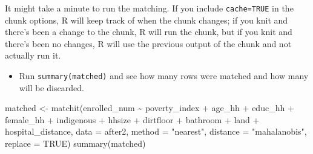 \documentclass[
  letterpaper,
  DIV=11,
  numbers=noendperiod]{scrartcl}
\newenvironment{Shaded}{\begin{snugshade}}{\end{snugshade}}
\newcommand{\AttributeTok}[1]{\textcolor[rgb]{0.40,0.45,0.13}{#1}}
\newcommand{\ConstantTok}[1]{\textcolor[rgb]{0.56,0.35,0.01}{#1}}
\newcommand{\FunctionTok}[1]{\textcolor[rgb]{0.28,0.35,0.67}{#1}}
\newcommand{\NormalTok}[1]{\textcolor[rgb]{0.00,0.23,0.31}{#1}}
\newcommand{\OtherTok}[1]{\textcolor[rgb]{0.00,0.23,0.31}{#1}}
\newcommand{\SpecialCharTok}[1]{\textcolor[rgb]{0.37,0.37,0.37}{#1}}
\newcommand{\StringTok}[1]{\textcolor[rgb]{0.13,0.47,0.30}{#1}}
\providecommand{\tightlist}{%
  \setlength{\itemsep}{0pt}\setlength{\parskip}{0pt}}\usepackage{longtable,booktabs,array}
\begin{document}
It might take a minute to run the matching. If you include
\texttt{cache=TRUE} in the chunk options, R will keep track of when the
chunk changes; if you knit and there's been a change to the chunk, R
will run the chunk, but if you knit and there's been no changes, R will
use the previous output of the chunk and not actually run it.

\begin{itemize}
\tightlist
\item
  Run \texttt{summary(matched)} and see how many rows were matched and
  how many will be discarded.
\end{itemize}

\begin{Shaded}
\begin{Highlighting}[numbers=left,,]
\NormalTok{matched }\OtherTok{\textless{}{-}} \FunctionTok{matchit}\NormalTok{(enrolled\_num }\SpecialCharTok{\textasciitilde{}}\NormalTok{ poverty\_index }\SpecialCharTok{+}\NormalTok{ age\_hh }\SpecialCharTok{+}\NormalTok{ educ\_hh }\SpecialCharTok{+}\NormalTok{ female\_hh }\SpecialCharTok{+} 
\NormalTok{                     indigenous }\SpecialCharTok{+}\NormalTok{ hhsize }\SpecialCharTok{+}\NormalTok{ dirtfloor }\SpecialCharTok{+}\NormalTok{ bathroom }\SpecialCharTok{+}\NormalTok{ land }\SpecialCharTok{+} 
\NormalTok{                     hospital\_distance, }
                   \AttributeTok{data =}\NormalTok{ after2,}
                   \AttributeTok{method =} \StringTok{"nearest"}\NormalTok{, }\AttributeTok{distance =} \StringTok{"mahalanobis"}\NormalTok{, }\AttributeTok{replace =} \ConstantTok{TRUE}\NormalTok{)}
\FunctionTok{summary}\NormalTok{(matched)}
\end{Highlighting}
\end{Shaded}
\end{document}
